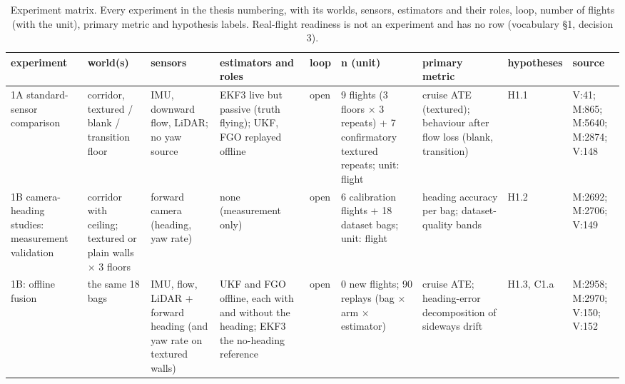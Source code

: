 \begin{table}[htbp]
\centering
\scriptsize
\caption{Experiment matrix. Every experiment in the thesis numbering, with its worlds, sensors, estimators and their roles, loop, number of flights (with the unit), primary metric and hypothesis labels. Real-flight readiness is not an experiment and has no row (vocabulary \S{}1, decision 3).}
\label{tab:methods_experiment_matrix}
\begin{tabular}{p{}p{}p{}p{}p{}p{}p{}p{}p{}}
\toprule
\textbf{experiment} & \textbf{world(s)} & \textbf{sensors} & \textbf{estimators and roles} & \textbf{loop} & \textbf{n (unit)} & \textbf{primary metric} & \textbf{hypotheses} & \textbf{source} \\
\midrule
1A standard-sensor comparison & corridor, textured / blank / transition floor & IMU, downward flow, LiDAR; no yaw source & EKF3 live but passive (truth flying); UKF, FGO replayed offline & open & 9 flights (3 floors $\times$ 3 repeats) + 7 confirmatory textured repeats; unit: flight & cruise ATE (textured); behaviour after flow loss (blank, transition) & H1.1 & V:41; M:865; M:5640; M:2874; V:148 \\
1B camera-heading studies: measurement validation & corridor with ceiling; textured or plain walls $\times$ 3 floors & forward camera (heading, yaw rate) & none (measurement only) & open & 6 calibration flights + 18 dataset bags; unit: flight & heading accuracy per bag; dataset-quality bands & H1.2 & M:2692; M:2706; V:149 \\
1B: offline fusion & the same 18 bags & IMU, flow, LiDAR + forward heading (and yaw rate on textured walls) & UKF and FGO offline, each with and without the heading; EKF3 the no-heading reference & open & 0 new flights; 90 replays (bag $\times$ arm $\times$ estimator) & cruise ATE; heading-error decomposition of sideways drift & H1.3, C1.a & M:2958; M:2970; V:150; V:152 \\

\end{tabular}
\end{table}
